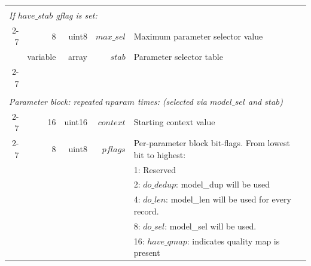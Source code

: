\documentclass[a4paper]{article}
\begin{document}
\begin{table}
\begin{tabular}{|r|r|r|r|r|p{8cm}|l|l|}
\multicolumn{8}{|l|}{}\\[-0.5em]
\multicolumn{8}{|l|}{\textit{If $have\_stab$ gflag is set:} }                                                                                                                                 \\
\cline{2-7}
                       & \multicolumn{2}{r|}{8}        & uint8          & $max\_sel$                     & \multicolumn{2}{p{8.4cm}|}{Maximum parameter selector value} & \\
                       & \multicolumn{2}{r|}{variable} & array          & $stab$                         & \multicolumn{2}{p{8.4cm}|}{Parameter selector table} & \\
\cline{2-7}
\multicolumn{8}{|l|}{}\\
\hline
\hline
\multicolumn{8}{|l|}{}\\[-0.7em]
\multicolumn{8}{|l|}{\textit{Parameter block: repeated $nparam$ times: (selected via $model\_sel$ and $stab$)}} \\
\cline{2-7}
                       & \multicolumn{2}{r|}{16}        & uint16        & $context$                      & \multicolumn{2}{p{8.4cm}|}{Starting context value} & \\
\cline{2-7}
                       & \multicolumn{2}{r|}{8}        & uint8          & $pflags$                       & \multicolumn{2}{p{8.4cm}|}{Per-parameter block bit-flags. From lowest bit to highest:} & \\
                       & \multicolumn{2}{r|}{}         &                &                                & \multicolumn{2}{p{8.4cm}|}{1: Reserved} & \\
                       & \multicolumn{2}{r|}{}         &                &                                & \multicolumn{2}{p{8.4cm}|}{2: $do\_dedup$: model\_dup will be used} & \\
                       & \multicolumn{2}{r|}{}         &                &                                & \multicolumn{2}{p{8.4cm}|}{4: $do\_len$: model\_len will be used for every record.} & \\
                       & \multicolumn{2}{r|}{}         &                &                                & \multicolumn{2}{p{8.4cm}|}{8: $do\_sel$: model\_sel will be used.} & \\
                       & \multicolumn{2}{r|}{}         &                &                                & \multicolumn{2}{p{8.4cm}|}{16: $have\_qmap$: indicates quality map is present} & \\

\end{tabular}
\end{table}
\end{document}
